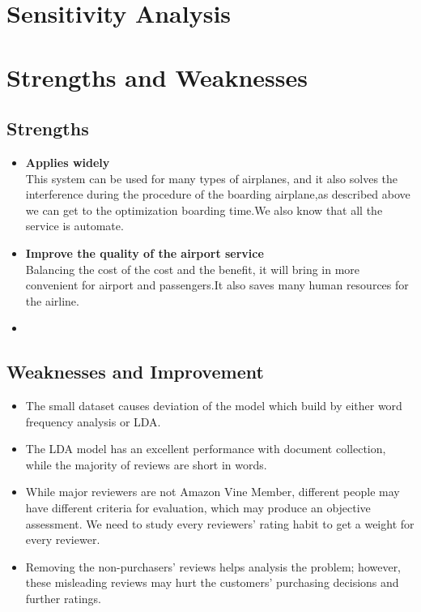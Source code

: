 \documentclass{mcmthesis}
\begin{document}
\section{Sensitivity Analysis}

\section{Strengths and Weaknesses}
\subsection{Strengths}
\begin{itemize}
  \item \textbf{Applies widely}\\
        This  system can be used for many types of airplanes, and it also
        solves the interference during  the procedure of the boarding
        airplane,as described above we can get to the  optimization
        boarding time.We also know that all the service is automate.
  \item \textbf{Improve the quality of the airport service}\\
        Balancing the cost of the cost and the benefit, it will bring in
        more convenient  for airport and passengers.It also saves many
        human resources for the airline. \item \textbf{}
\end{itemize}
\subsection{Weaknesses and Improvement}
\begin{itemize}
  \item The small dataset causes deviation of the model which build by either word frequency analysis or LDA.
\end{itemize}
\begin{itemize}
  \item The LDA model has an excellent performance with document collection, while the majority of reviews are short in words. 
\end{itemize}
\begin{itemize}
  \item While major reviewers are not Amazon Vine Member, different people may have different criteria for evaluation, which may produce an objective assessment. We need to study every reviewers' rating habit to get a weight for every reviewer.
\end{itemize}
\begin{itemize}
  \item Removing the non-purchasers' reviews helps analysis the problem; however, these misleading reviews may hurt the customers' purchasing decisions and further ratings.
\end{itemize}
\end{document}
